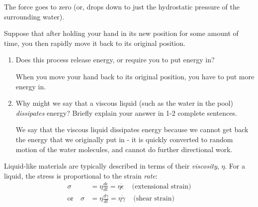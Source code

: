 \begin{activity}
\begin{ctqs}
\begin{enumerate}
				\begin{solution}[1in]
					The force goes to zero (or, drops down to just the hydrostatic pressure of the surrounding water).
				\end{solution}
			
		\end{enumerate}
		
	\question Suppose that after holding your hand in its new position for some amount of time, you then rapidly move it back to its original position.
	
		\begin{enumerate}
			
			\item Does this process release energy, or require you to put energy in?
			
				\begin{solution}[1in]
					When you move your hand back to its original position, you have to put more energy in.
				\end{solution}
			
			\item Why might we say that a viscous liquid (such as the water in the pool) \emph{dissipates} energy? Briefly explain your answer in 1-2 complete sentences.
			
				\begin{solution}[2in]
					We say that the viscous liquid dissipates energy because we cannot get back the energy that we originally put in - it is quickly converted to random motion of the water molecules, and cannot do further directional work.
				\end{solution}
			
		\end{enumerate}
	
\end{ctqs}

\begin{infobox}
	
	Liquid-like materials are typically described in terms of their \emph{viscosity}, $\eta$.  For a liquid, the stress is proportional to the strain \emph{rate}:
	\begin{align*}
		\sigma &= \eta\frac{d\epsilon}{dt}=\eta\dot\epsilon\,\,\,\,\,\,\,\text{(extensional strain)}\\
		\text{or}\,\,\,\,\,\,\sigma &= \eta\frac{d\gamma}{dt}=\eta\dot\gamma\,\,\,\,\,\,\,\text{(shear strain)}
	\end{align*}


\end{infobox}
\end{activity}
